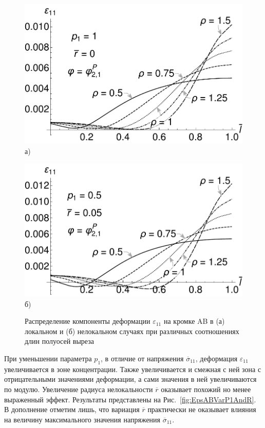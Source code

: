 \begin{figure}[ht]
    \begin{minipage}[b][][b]{0.49\linewidth}\centering
        \includegraphics[width=\linewidth]{pics/KirshABEps11Local.pdf} \\ а)
    \end{minipage}
    \hfill
    \begin{minipage}[b][][b]{0.49\linewidth}\centering
        \includegraphics[width=\linewidth]{pics/KirshABEps11r005p05.pdf} \\ б)
    \end{minipage}
    \caption{Распределение компоненты деформации $\varepsilon_{11}$ на кромке AB в (а) локальном и (б) нелокальном случаях при различных соотношениях длин полуосей выреза}
    \label{fig:EpsABLocAndNonloc}
\end{figure}

При уменьшении параметра $p_1$, в отличие от напряжения $\overline{\sigma}_{11}$, деформация $\varepsilon_{11}$ увеличивается в зоне концентрации. Также увеличивается и смежная с ней зона с отрицательными значениями деформации, а сами значения в ней увеличиваются по модулю. Увеличение радиуса нелокальности $\overline{r}$ оказывает похожий  но менее выраженный эффект. Результаты представлены на Рис.~\ref{fig:EpsABVarP1AndR}. В дополнение отметим лишь, что вариация $\overline{r}$ практически не оказывает влияния на величину максимального значения напряжения $\overline{\sigma}_{11}$.

